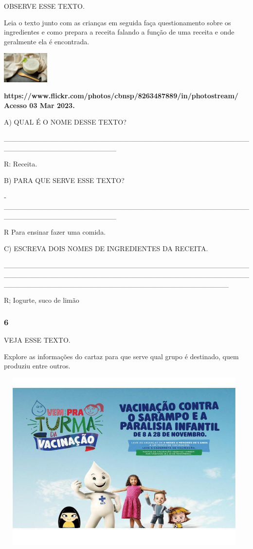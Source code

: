 OBSERVE ESSE TEXTO.

Leia o texto junto com as crianças em seguida faça questionamento sobre
os ingredientes e como prepara a receita falando a função de uma receita
e onde geralmente ela é encontrada.

\includegraphics[width=0.92986in,height=0.61875in]{media/image106.jpeg}

\textbf{https://www.flickr.com/photos/cbnsp/8263487889/in/photostream/
Acesso 03 Mar 2023.}

A) QUAL É O NOME DESSE TEXTO?

\_\_\_\_\_\_\_\_\_\_\_\_\_\_\_\_\_\_\_\_\_\_\_\_\_\_\_\_\_\_\_\_\_\_\_\_\_\_\_\_\_\_\_\_\_\_\_\_\_\_\_\_\_\_\_\_\_\_\_\_\_\_\_\_\_\_\_\_\_\_

R: Receita.

B) PARA QUE SERVE ESSE TEXTO?

­­­­­­­­­­­­­­­­­­­­­­­­­­­­­­­­­­­­­­­­­­­­­­­­­­­­\_\_\_\_\_\_\_\_\_\_\_\_\_\_\_\_\_\_\_\_\_\_\_\_\_\_\_\_\_\_\_\_\_\_\_\_\_\_\_\_\_\_\_\_\_\_\_\_\_\_\_\_\_\_\_\_\_\_\_\_\_\_\_\_\_\_\_\_\_\_

R Para ensinar fazer uma comida.

C) ESCREVA DOIS NOMES DE INGREDIENTES DA RECEITA.

\_\_\_\_\_\_\_\_\_\_\_\_\_\_\_\_\_\_\_\_\_\_\_\_\_\_\_\_\_\_\_\_\_\_\_\_\_\_\_\_\_\_\_\_\_\_\_\_\_\_\_\_\_\_\_\_\_\_\_\_\_\_\_\_\_\_\_\_\_\_\_\_\_\_\_\_\_\_\_\_\_\_\_\_\_\_\_\_\_\_\_\_\_\_\_\_\_\_\_\_\_\_\_\_\_\_\_\_\_\_\_\_\_\_\_\_\_\_\_\_\_\_\_\_\_\_\_\_\_\_\_\_\_\_\_\_\_\_\_\_

R; Iogurte, suco de limão

\subsubsection{6}\label{section-47}

VEJA ESSE TEXTO.

Explore as informações do cartaz para que serve qual grupo é destinado,
quem produziu entre outros.

\includegraphics[width=5.14861in,height=3.58125in]{media/image107.jpeg}

